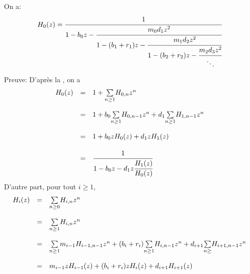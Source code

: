 \begin{proposition}\label{H-frac} On a:
	\[
		\begin{array}{r c l}
			H_{0}(z)=\cfrac{1}{1-b_{0}z-\cfrac{m_{0}d_{1}z^2}{1-(b_{1}+r_{1})z-\cfrac{m_{1}d_{2}z^2}
			{1-(b_{2}+r_{2})z-\cfrac{m_{2}d_{3}z^2}{\ddots}}}}
		\end{array}
	\]
\end{proposition}
Preuve:
D'après la , on a
$$
	\begin{array}{r c l}
		H_{0}(z) & =       & 1+\underset{n\geq1}{\sum}H_{0,n}z^n                                                 \\
		         & \text{}                                                                                       \\
		         & =       & 1+b_{0}\underset{n\geq1}{\sum}H_{0,n-1}z^n+d_{1}\underset{n\geq1}{\sum}H_{1,n-1}z^n \\
		         & \text{}                                                                                       \\
		         & =       & 1+b_{0}zH_{0}(z)+d_{1}zH_{1}(z)                                                     \\
		         & \text{}                                                                                       \\
		         & =       & \cfrac{1}{1-b_{0}z-d_{1}z\cfrac{H_{1}(z)}{H_{0}(z)}}
	\end{array}
$$
D'autre part, pour tout $i\geq1$,
\[
	\begin{array}{r c l}
		H_{i}(z) & =       & \underset{n\geq0}{\sum}H_{i,n}z^n                                                                     \\
		         & \text{} &                                                                                                       \\
		         & =       & \underset{n\geq1}{\sum}H_{i,n}z^n                                                                     \\
		         & \text{} &                                                                                                       \\
		         & =       & \underset{n\geq1}{\sum}m_{i-1}H_{i-1,n-1}z^n+(b_{i}+r_{i})\underset{n\geq1}{\sum}H_{i,n-1}z^n+d_{i+1}
		\underset{n\geq}{\sum}H_{i+1,n-1}z^n                                                                                       \\
		         & \text{} &                                                                                                       \\
		         & =       & m_{i-1}zH_{i-1}(z)+(b_{i}+r_{i})zH_{i}(z)+d_{i+1}H_{i+1}(z)
	\end{array}
\]
